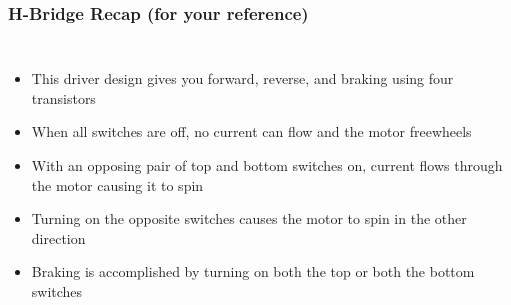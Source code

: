 \documentclass{beamer}
\begin{document}
\begin{frame}
\frametitle{H-Bridge Recap \small (for your reference)}
\begin{columns}[t]
\begin{itemize}
  \item This driver design gives you forward, reverse, and braking using four transistors
  \item<2-> When all switches are off, no current can flow and the motor freewheels
  \item<3-> With an opposing pair of top and bottom switches on, current flows through the motor causing it to spin
  \item<4-> Turning on the opposite switches causes the motor to spin in the other direction
  \item<5-> Braking is accomplished by turning on both the top or both the bottom switches
\end{itemize}


\end{columns}
\end{frame}
\end{document}
